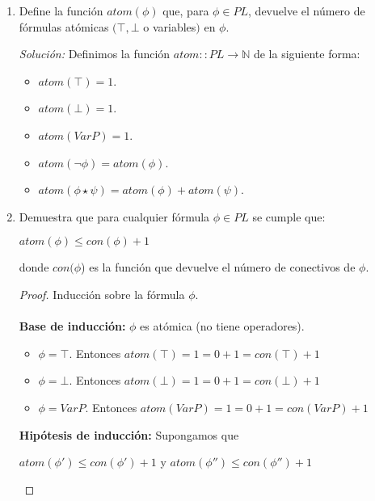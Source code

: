 \documentclass[letterpaper,12pt]{article}
\begin{document}
\begin{enumerate}
    \newpage
    \item Define la función $atom(\phi)$ que, para $\phi \in PL$, devuelve el 
    número de fórmulas atómicas $(\top, \bot$ o variables$)$ en $\phi$.
    
    \textit{Solución:} Definimos la función $atom :: PL \rightarrow \mathbb{N}$
    de la siguiente forma:
    \begin{itemize}
        \item $atom(\top) = 1$.
        \item $atom(\bot) = 1$.
        \item $atom(Var P) = 1$.
        \item $atom(\neg \phi) = atom(\phi)$. 
        \item $atom(\phi \star \psi) = atom(\phi) + atom(\psi)$.
    \end{itemize}

    \item Demuestra que para cualquier fórmula $\phi \in PL$ se cumple que:
    \begin{center}
        $atom(\phi) \leq con(\phi) + 1$
    \end{center}
    donde $con(\phi$) es la función que devuelve el número de conectivos de 
    $\phi$.

    \begin{proof}
        Inducción sobre la fórmula $\phi$. \\ \\
        \textbf{Base de inducción:} $\phi$ es atómica (no tiene operadores). 
        \begin{itemize}
            \item $\phi = \top$. Entonces 
            $atom(\top)= 1 = 0 + 1 = con(\top) + 1$
            \item $\phi = \bot$. Entonces 
            $atom(\bot)= 1 = 0 + 1 = con(\bot) + 1$
            \item $\phi = Var P$. Entonces 
            $atom(Var P) = 1 = 0 + 1 = con(Var P) + 1$
        \end{itemize}

        \textbf{Hipótesis de inducción:} Supongamos que 
        \begin{center}
            $atom(\phi') \leq con(\phi') + 1$ y $atom(\phi'') \leq con(\phi'') + 1$
        \end{center}


\end{proof}
\end{enumerate}
\end{document}
